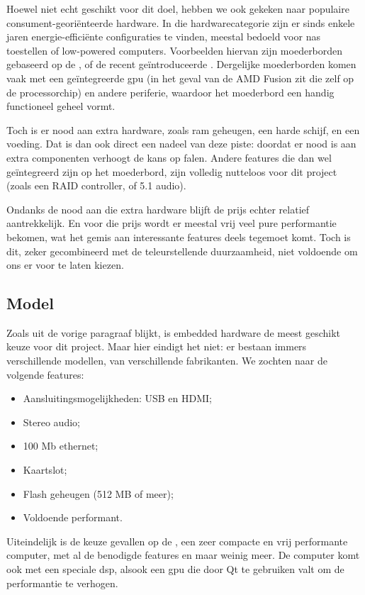 Hoewel niet echt geschikt voor dit doel, hebben we ook gekeken naar populaire consument-georiënteerde hardware. In die hardwarecategorie zijn er sinds enkele jaren energie-efficiënte configuraties te vinden, meestal bedoeld voor \ac{nas} toestellen of low-powered computers. Voorbeelden hiervan zijn moederborden gebaseerd op de , of de recent geïntroduceerde . Dergelijke moederborden komen vaak met een geïntegreerde \ac{gpu} (in het geval van de AMD Fusion zit die zelf op de processorchip) en andere periferie, waardoor het moederbord een handig functioneel geheel vormt.

Toch is er nood aan extra hardware, zoals \ac{ram} geheugen, een harde schijf, en een voeding. Dat is dan ook direct een nadeel van deze piste: doordat er nood is aan extra componenten verhoogt de kans op falen. Andere features die dan wel geïntegreerd zijn op het moederbord, zijn volledig nutteloos voor dit project (zoals een RAID controller, of 5.1 audio).

Ondanks de nood aan die extra hardware blijft de prijs echter relatief aantrekkelijk. En voor die prijs wordt er meestal vrij veel pure performantie bekomen, wat het gemis aan interessante features deels tegemoet komt. Toch is dit, zeker gecombineerd met de teleurstellende duurzaamheid, niet voldoende om ons er voor te laten kiezen.

\subsection{Model}

Zoals uit de vorige paragraaf blijkt, is embedded hardware de meest geschikt keuze voor dit project. Maar hier eindigt het niet: er bestaan immers verschillende modellen, van verschillende fabrikanten. We zochten naar de volgende features:
\begin{itemize}
\item Aansluitingsmogelijkheden: USB en HDMI;
\item Stereo audio;
\item 100 Mb ethernet;
\item Kaartslot;
\item Flash geheugen (512 MB of meer);
\item Voldoende performant.
\end{itemize}

Uiteindelijk is de keuze gevallen op de , een zeer compacte en vrij performante computer, met al de benodigde features en maar weinig meer. De computer komt ook met een speciale \ac{dsp}, alsook een \ac{gpu} die door Qt te gebruiken valt om de performantie te verhogen.
